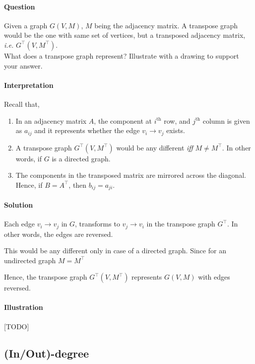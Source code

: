 \documentclass[11pt]{article}
\begin{document}
\paragraph*{Question}
\label{sec:orgcb1fbcf}
Given a graph \(G(V,M)\), \(M\) being the adjacency matrix.
A transpose graph would be the one with same set of
vertices, but a transposed adjacency matrix, \emph{i.e.}
\(G^{\top}(V,M^{\top})\). \\[0pt]
What does a transpose graph represent?  Illustrate with
a drawing to support your answer.

\paragraph*{Interpretation}
\label{sec:orgd879822}
Recall that,
\begin{enumerate}
\item In an adjacency matrix \(A\), the component at
\(i^{\text{th}}\) row, and \(j^{\text{th}}\) column is
given as \(a_{ij}\) and it represents whether the edge
\(v_{i}\to v_{j}\) exists.
\item A transpose graph \(G^{\top}(V,M^{\top})\) would be
any different \emph{iff} \(M\ne M^{\top}\).  In other
words, if \(G\) is a directed graph.
\item The components in the transposed matrix are mirrored
across the diagonal.  Hence, if \(B = A^{\top}\), then
\(b_{ij} = a_{ji}\).
\end{enumerate}

\paragraph*{Solution}
\label{sec:org42d8faf}

Each edge \(v_{i}\to v_{j}\) in \(G\), transforms to
\(v_{j}\to v_{i}\) in the transpose graph \(G^{\top}\).
In other words, the edges are reversed.

This would be any different only in case of a directed
graph.  Since for an undirected graph \(M=M^{\top}\)

Hence, the transpose graph \(G^{\top}(V,M^{\top})\)
represents \(G(V,M)\) with edges reversed.

\paragraph*{Illustration}
\label{sec:org4a71694}

[TODO]

\subsection{(In/Out)-degree}
\label{sec:org4430ce5}
\end{document}
